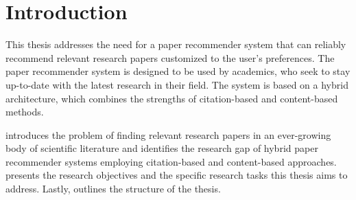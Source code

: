 \chapter{Introduction} \label{sec:introduction}

This thesis addresses the need for a paper recommender system that can reliably recommend relevant research papers customized to the user's preferences.
The paper recommender system is designed to be used by academics, who seek to stay up-to-date with the latest research in their field. The system is based on a hybrid architecture, which combines the strengths of citation-based and content-based methods.

 introduces the problem of finding relevant research papers in an ever-growing body of scientific literature and identifies the research gap of hybrid paper recommender systems employing citation-based and content-based approaches.  presents the research objectives and the specific research tasks this thesis aims to address. Lastly,  outlines the structure of the thesis.
